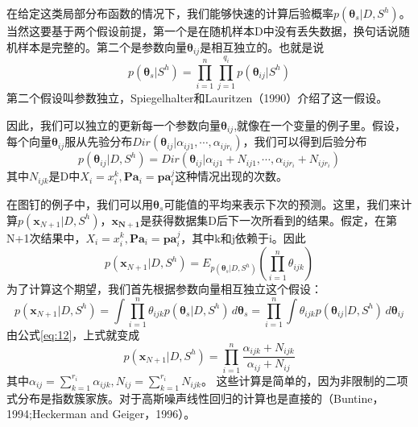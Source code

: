 \documentclass[10pt,a4paper]{article}
\begin{document}
\begin{CJK*}{UTF8}{gkai}
在给定这类局部分布函数的情况下，我们能够快速的计算后验概率$p(\boldsymbol{\theta}_s|D,S^h)$。当然这要基于两个假设前提，第一个是在随机样本D中没有丢失数据，换句话说随机样本是完整的。第二个是参数向量$\boldsymbol{\theta}_{ij}$是相互独立的。也就是说
\begin{equation}
p(\boldsymbol{\theta}_s|S^h)=\prod_{i=1}^n\prod_{j=1}^{q_i}p(\boldsymbol{\theta}_{ij}|S^h) 
\end{equation}
第二个假设叫参数独立，Spiegelhalter和Lauritzen（1990）介绍了这一假设。


因此，我们可以独立的更新每一个参数向量$\boldsymbol{\theta}_{ij}$,就像在一个变量的例子里。假设，每个向量$\boldsymbol{\theta}_{ij}$服从先验分布$Dir(\boldsymbol{\theta}_{ij}|\alpha_{ij1},\cdots,\alpha_{ijr_i})$，我们可以得到后验分布
\begin{equation}
p(\boldsymbol{\theta}_{ij}|D,S^h)=Dir(\boldsymbol{\theta}_{ij}|\alpha_{ij1}+N_{ij1},\cdots,\alpha_{ijr_i}+N_{ijr_i})
\end{equation}
其中$N_{ijk}$是D中$X_i=x_i^k,\boldsymbol{Pa}_i=\boldsymbol{pa}_i^j$这种情况出现的次数。


在图钉的例子中，我们可以用$\boldsymbol{\theta}_s$可能值的平均来表示下次的预测。这里，我们来计算$p(\boldsymbol{x}_{N+1}|D,S^h)$，$\boldsymbol{x_{N+1}}$是获得数据集D后下一次所看到的结果。假定，在第N+1次结果中，$X_i=x_i^k,\boldsymbol{Pa}_i=\boldsymbol{pa}_i^j$，其中k和j依赖于i。因此
\begin{equation}
p(\boldsymbol{x}_{N+1}|D,S^h)=E_{p(\boldsymbol{\theta}_s|D,S^h)}(\prod_{i=1}^n\theta_{ijk})  \nonumber
\end{equation}
为了计算这个期望，我们首先根据参数向量相互独立这个假设：
\begin{equation}
p(\boldsymbol{x}_{N+1}|D,S^h)=\int \prod_{i=1}^n \theta_{ijk} p(\boldsymbol{\theta}_s|D,S^h)\, d\boldsymbol{\theta}_s
=\prod_{i=1}^n \int \theta_{ijk}p(\boldsymbol{\theta}_{ij}|D,S^h)\,d\boldsymbol{\theta}_{ij} \nonumber
\end{equation}
由公式\ref{eq:12}，上式就变成
\begin{equation}
\label{eq:27}
p(\boldsymbol{x}_{N+1}|D,S^h)=\prod_{i=1}^n \frac{\alpha_{ijk}+N_{ijk}}{\alpha_{ij}+N_{ij}}
\end{equation}
其中$\alpha_{ij}=\sum_{k=1}^{r_i}\alpha_{ijk},N_{ij}=\sum_{k=1}^{r_i}N_{ijk}$。
这些计算是简单的，因为非限制的二项式分布是指数簇家族。对于高斯噪声线性回归的计算也是直接的（Buntine，1994;Heckerman and Geiger，1996）。



\end{CJK*}
\end{document}
